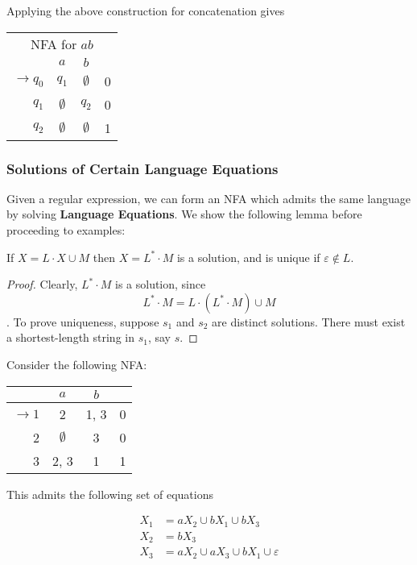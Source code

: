 Applying the above construction for concatenation gives
\begin{center}
\begin{tabular}{r| c c r}
      \multicolumn{4}{c}{NFA for $ab$}\\
      & $a$ & $b$ & \\\hline
      $\to q_0$ & $q_1$ & $\emptyset$ & 0\\
          $q_1$ & $\emptyset$ & $q_2$ & 0\\
          $q_2$ & $\emptyset$ & $\emptyset$ & 1
 \end{tabular}
\end{center}

\subsubsection{Solutions of Certain Language Equations}

Given a regular expression, we can form an NFA which admits the same language by solving \textbf{Language Equations}. We show the following lemma before proceeding to examples:

\begin{lemma}
      If $X=L\cdot X\cup M$ then $X=L^*\cdot M$ is a solution, and is unique if $\varepsilon\not\in L$. 
\end{lemma}

\begin{proof}
      Clearly, $L^*\cdot M$ is a solution, since \[L^*\cdot M = L\cdot (L^*\cdot M)\cup M\]. To prove uniqueness, suppose $s_1$ and $s_2$ are distinct solutions. There must exist a shortest-length string in $s_1$, say $s$. 
\end{proof}

Consider the following NFA:

\begin{center}\begin{tabular}{r| c c r}
      & $a$ & $b$ & \\\hline
      $\to 1$ & 2 & 1, 3 & 0\\
            2 & $\emptyset$ & 3 & 0\\
            3 & 2, 3 & 1 & 1
 \end{tabular}\end{center}

This admits the following set of equations 

\begin{align}
      X_1 &= aX_2\cup bX_1\cup bX_3\\
      X_2 &= bX_3\\
      X_3 &= aX_2\cup aX_3\cup bX_1\cup\varepsilon
\end{align}

